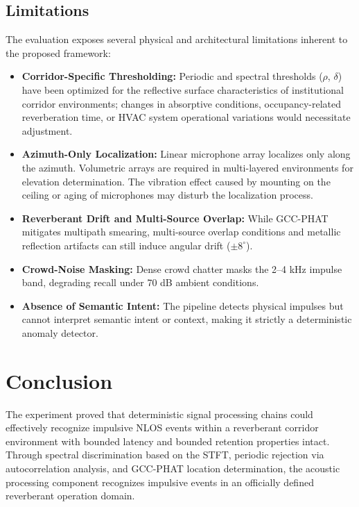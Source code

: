 \documentclass[conference]{IEEEtran}
\begin{document}
\subsection{Limitations}
The evaluation exposes several physical and architectural limitations inherent to the proposed framework:
\begin{itemize}
    \item \textbf{Corridor-Specific Thresholding:} Periodic and spectral thresholds ($\rho$, $\delta$) have been optimized for the reflective surface characteristics of institutional corridor environments; changes in absorptive conditions, occupancy-related reverberation time, or HVAC system operational variations would necessitate adjustment.
    \item \textbf{Azimuth-Only Localization:} Linear microphone array localizes only along the azimuth. Volumetric arrays are required in multi-layered environments for elevation determination. The vibration effect caused by mounting on the ceiling or aging of microphones may disturb the localization process.
    \item \textbf{Reverberant Drift and Multi-Source Overlap:} While GCC-PHAT mitigates multipath smearing, multi-source overlap conditions and metallic reflection artifacts can still induce angular drift ($\pm 8^{\circ}$).
    \item \textbf{Crowd-Noise Masking:} Dense crowd chatter masks the 2--4 kHz impulse band, degrading recall under 70 dB ambient conditions.
    \item \textbf{Absence of Semantic Intent:} The pipeline detects physical impulses but cannot interpret semantic intent or context, making it strictly a deterministic anomaly detector.
\end{itemize}

\section{Conclusion}
The experiment proved that deterministic signal processing chains could effectively recognize impulsive NLOS events within a reverberant corridor environment with bounded latency and bounded retention properties intact. Through spectral discrimination based on the STFT, periodic rejection via autocorrelation analysis, and GCC-PHAT location determination, the acoustic processing component recognizes impulsive events in an officially defined reverberant operation domain.
\end{document}
